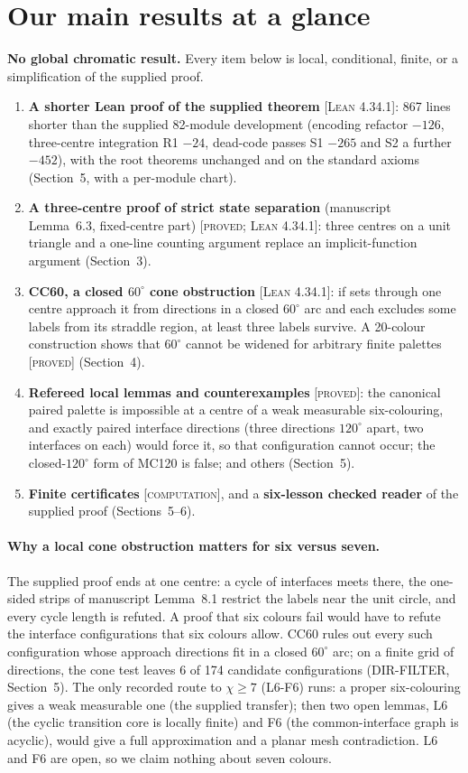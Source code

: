 \documentclass[11pt]{article}
\theoremstyle{definition}
\theoremstyle{remark}
\newcommand{\st}[1]{\textsc{[#1]}}
\begin{document}
\section*{Our main results at a glance}
\textbf{No global chromatic result.} Every item below is local, conditional, finite, or a simplification of the supplied proof.
\begin{enumerate}
\item \textbf{A shorter Lean proof of the supplied theorem} \st{Lean 4.34.1}: 867 lines shorter than the supplied 82-module development (encoding refactor $-126$, three-centre integration R1 $-24$, dead-code passes S1 $-265$ and S2 a further $-452$), with the root theorems unchanged and on the standard axioms (Section~5, with a per-module chart).
\item \textbf{A three-centre proof of strict state separation} (manuscript Lemma~6.3, fixed-centre part) \st{proved; Lean 4.34.1}: three centres on a unit triangle and a one-line counting argument replace an implicit-function argument (Section~3).
\item \textbf{CC60, a closed $60^\circ$ cone obstruction} \st{Lean 4.34.1}: if sets through one centre approach it from directions in a closed $60^\circ$ arc and each excludes some labels from its straddle region, at least three labels survive. A 20-colour construction shows that $60^\circ$ cannot be widened for arbitrary finite palettes \st{proved} (Section~4).
\item \textbf{Refereed local lemmas and counterexamples} \st{proved}: the canonical paired palette is impossible at a centre of a weak measurable six-colouring, and exactly paired interface directions (three directions $120^\circ$ apart, two interfaces on each) would force it, so that configuration cannot occur; the closed-$120^\circ$ form of MC120 is false; and others (Section~5).
\item \textbf{Finite certificates} \st{computation}, and a \textbf{six-lesson checked reader} of the supplied proof (Sections~5--6).
\end{enumerate}

\paragraph{Why a local cone obstruction matters for six versus seven.} The supplied proof ends at one centre: a cycle of interfaces meets there, the one-sided strips of manuscript Lemma~8.1 restrict the labels near the unit circle, and every cycle length is refuted. A proof that six colours fail would have to refute the interface configurations that six colours allow. CC60 rules out every such configuration whose approach directions fit in a closed $60^\circ$ arc; on a finite grid of directions, the cone test leaves 6 of 174 candidate configurations (DIR-FILTER, Section~5). The only recorded route to $\chi\ge7$ (L6-F6) runs: a proper six-colouring gives a weak measurable one (the supplied transfer); then two open lemmas, L6 (the cyclic transition core is locally finite) and F6 (the common-interface graph is acyclic), would give a full approximation and a planar mesh contradiction. L6 and F6 are open, so we claim nothing about seven colours.
\end{document}

